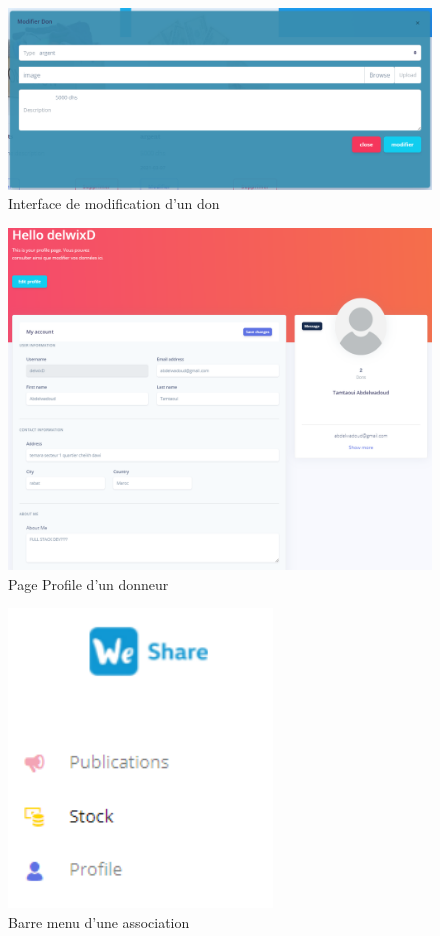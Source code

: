 \begin{figure}[!h]
\begin{center}
\includegraphics[width=17cm]{modification don.png}
\caption{Interface de modification d'un don}
\end{center}
\end{figure}

\begin{figure}[!h]
\begin{center}
\includegraphics[width=17cm]{profile3Donneur.png}
\caption{Page Profile d'un donneur}
\end{center}
\end{figure}


\begin{figure}[!h]
\begin{center}
\includegraphics[width=7cm]{Association menu.png}
\caption{Barre menu d'une association}
\end{center}
\end{figure}

